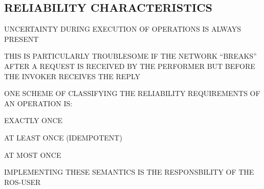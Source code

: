\begin{bwslide}
\part*	{RELIABILITY CHARACTERISTICS}\bf

\begin{nrtc}
\item	UNCERTAINTY DURING EXECUTION OF OPERATIONS IS ALWAYS PRESENT

\item	THIS IS PARTICULARLY TROUBLESOME IF THE NETWORK ``BREAKS''
	AFTER A REQUEST IS RECEIVED BY THE PERFORMER BUT BEFORE
	THE INVOKER RECEIVES THE REPLY

\item	ONE SCHEME OF CLASSIFYING THE RELIABILITY REQUIREMENTS OF AN OPERATION
	IS:
    \begin{nrtc}
    \item	EXACTLY ONCE

    \item	AT LEAST ONCE (IDEMPOTENT)

    \item	AT MOST ONCE
    \end{nrtc}

\item	IMPLEMENTING THESE SEMANTICS IS THE RESPONSBILITY OF THE ROS-USER
\end{nrtc}
\end{bwslide}


